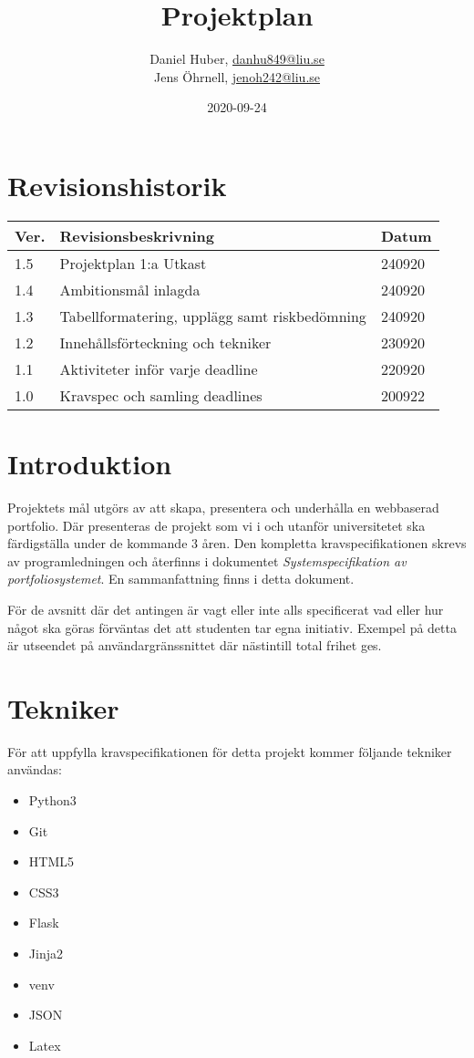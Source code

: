 \documentclass{TDP003mall}
\author{Daniel Huber, \url{danhu849@liu.se}\\
	Jens Öhrnell, \url{jenoh242@liu.se}}
\title{Projektplan}
\date{2020-09-24}
\begin{document}
\projectpage

\tableofcontents

\newpage
\section{Revisionshistorik}
\begin{table}[!h]
\begin{tabularx}{\linewidth}{|X|X|X|}
\hline
  Ver. & Revisionsbeskrivning & Datum \\\hline
  1.5 & Projektplan 1:a Utkast & 240920\\\hline
1.4 & Ambitionsmål inlagda & 240920\\\hline
1.3 & Tabellformatering, upplägg samt riskbedömning & 240920\\\hline
1.2 & Innehållsförteckning och tekniker & 230920\\\hline
1.1 & Aktiviteter inför varje deadline & 220920\\\hline
1.0 & Kravspec och samling deadlines & 200922 \\\hline
\end{tabularx}
\end{table}


\section{Introduktion}
Projektets mål utgörs av att skapa, presentera och underhålla en webbaserad portfolio. Där presenteras de projekt som vi i och utanför universitetet ska färdigställa under de kommande 3 åren. Den kompletta kravspecifikationen skrevs av programledningen och återfinns i dokumentet \textit{Systemspecifikation av portfoliosystemet}. En sammanfattning finns i detta dokument.

För de avsnitt där det antingen är vagt eller inte alls specificerat vad eller hur något ska göras förväntas det att studenten tar egna initiativ. Exempel på detta är utseendet på användargränssnittet där nästintill total frihet ges.

\section{Tekniker}
För att uppfylla kravspecifikationen för detta projekt kommer följande tekniker användas:
\begin{itemize}
\item Python3
\item Git
\item HTML5
\item CSS3
\item Flask
\item Jinja2
\item venv
\item JSON
\item Latex
\end{itemize}
\end{document}
